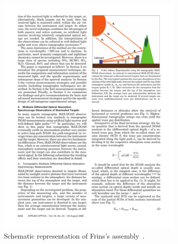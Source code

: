 \begin{figure}[htpb]
    \centering
    \begin{subfigure}[b]{.475\textwidth}
        \centering
        \includegraphics[trim=10.8cm 19.7cm 2cm 2cm, clip, %
        width=\textwidth]{img/pdf/frinsSchematics_p2.pdf}
        \caption{Schematic representation of Frins's
        assembly~\cite{Frins2006}.}
        \label{fig:frins_schem_1}
    \end{subfigure}
    \hfill
    \begin{subfigure}[b]{.475\textwidth}
        \centering

\end{subfigure}
\end{figure}
